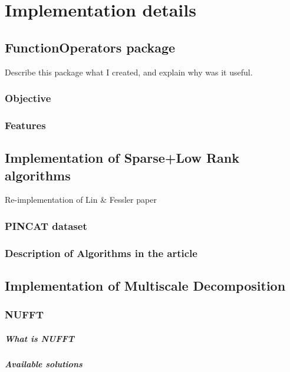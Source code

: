 \chapter{Implementation details}

\section{FunctionOperators package}
Describe this package what I created, and explain why was it useful.
\subsection{Objective}
\subsection{Features}

\section{Implementation of Sparse+Low Rank algorithms}
Re-implementation of Lin \& Fessler paper
\subsection{PINCAT dataset}
\subsection{Description of Algorithms in the article}

\section{Implementation of Multiscale Decomposition}

\subsection{NUFFT}
\paragraph{What is NUFFT}
\paragraph{Available solutions}
